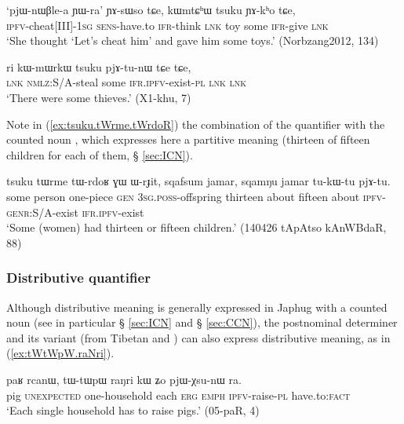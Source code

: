 \begin{exe}
\ex \label{ex:kWmtChW.tsuku}
\gll  `pjɯ-nɯβle-a ɲɯ-ra' ɲɤ-sɯso tɕe, kɯmtɕʰɯ tsuku ɲɤ-kʰo tɕe, \\
\textsc{ipfv}-cheat[III]-\textsc{1sg} \textsc{sens}-have.to \textsc{ifr}-think \textsc{lnk} toy some \textsc{ifr}-give \textsc{lnk} \\
\glt `She thought `Let's cheat him' and gave him some toys.' (Norbzang2012, 134)
\end{exe}

\begin{exe}
\ex \label{ex:kWmWrkW.tsuku}
\gll ri kɯ-mɯrkɯ tsuku pjɤ-tu-nɯ tɕe tɕe, \\
\textsc{lnk} \textsc{nmlz}:S/A-steal some \textsc{ifr}.\textsc{ipfv}-exist-\textsc{pl} \textsc{lnk} \textsc{lnk} \\
\glt `There were some thieves.' (X1-khu, 7)
\end{exe}

Note in (\ref{ex:tsuku.tWrme.tWrdoR}) the combination of the quantifier  with the counted noun , which expresses here a partitive meaning (thirteen of fifteen children for each of them, § \ref{sec:ICN}).

\begin{exe}
\ex \label{ex:tsuku.tWrme.tWrdoR}
\gll tsuku tɯrme tɯ-rdoʁ ɣɯ ɯ-rɟit, sqafsum jamar, sqamŋu jamar tu-kɯ-tu pjɤ-tu. \\
 some person one-piece \textsc{gen} \textsc{3sg}.\textsc{poss}-offspring thirteen about fifteen about \textsc{ipfv}-\textsc{genr}:S/A-exist \textsc{ifr}.\textsc{ipfv}-exist    \\
\glt  `Some (women) had thirteen or fifteen children.' (140426 tApAtso kAnWBdaR, 88)
\end{exe}
 
\subsubsection{Distributive quantifier} \label{sec:raNri}
 Although distributive meaning is generally expressed in Japhug with a counted noun (see in particular § \ref{sec:ICN} and § \ref{sec:CCN}), the postnominal determiner  and its variant  (from Tibetan  and ) can also express distributive meaning, as in (\ref{ex:tWtWpW.raNri}). 
 
\begin{exe}
\ex \label{ex:tWtWpW.raNri}
\gll paʁ rcanɯ, tɯ-tɯpɯ raŋri kɯ ʑo pjɯ-χsu-nɯ ra. \\
pig \textsc{unexpected} one-household each \textsc{erg} \textsc{emph} \textsc{ipfv}-raise-\textsc{pl} have.to:\textsc{fact} \\
 \glt `Each single household has to raise pigs.' (05-paR, 4)
 \end{exe}
 
